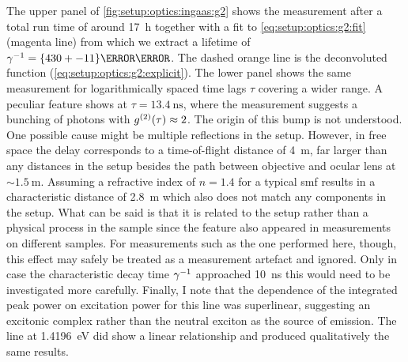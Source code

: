 The upper panel of \cref{fig:setup:optics:ingaas:g2} shows the measurement after a total run time of around \qty{17}{\hour} together with a fit to \cref{eq:setup:optics:g2:fit} (magenta line) from which we extract a lifetime of $\gamma\inverse = \qty{430+-11}{\pico\second}$.
The dashed orange line is the deconvoluted function (\cref{eq:setup:optics:g2:explicit}).
The lower panel shows the same measurement for logarithmically spaced time lags $\tau$ covering a wider range.
A peculiar feature shows at $\tau = \qty{13.4}{\nano\second}$, where the measurement suggests a bunching of photons with $g^{(2)}(\tau) \approx 2$.
The origin of this bump is not understood.
One possible cause might be multiple reflections in the setup.
However, in free space the delay corresponds to a time-of-flight distance of \qty{4}{\meter}, far larger than any distances in the setup besides the path between objective and ocular lens at $\sim\qty{1.5}{\meter}$.
Assuming a refractive index of $n=\num{1.4}$ for a typical \gls{smf} results in a characteristic distance of \qty{2.8}{\meter} which also does not match any components in the setup.
What can be said is that it is related to the setup rather than a physical process in the sample since the feature also appeared in  measurements on different samples.
For measurements such as the one performed here, though, this effect may safely be treated as a measurement artefact and ignored.
Only in case the characteristic decay time $\gamma^{-1}$ approached \qty{10}{\nano\second} this would need to be investigated more carefully.
Finally, I note that the dependence of the integrated peak power on excitation power for this line was superlinear, suggesting an excitonic complex rather than the neutral exciton as the source of emission.
The line at \qty{1.4196}{\eV} did show a linear relationship and produced qualitatively the same  results.
